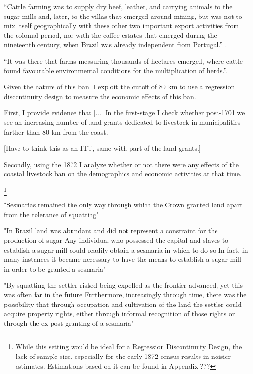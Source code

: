 \documentclass{article}
\begin{document}
\parencite[p~.]{Boxer1962-bj}

``Cattle farming was to supply dry beef, leather, and carrying animals to the sugar mills and, later, to the villas that emerged around mining, but was not to mix itself geographically with these other two important export activities from the colonial period, nor with the coffee estates that emerged during the nineteenth century,  when  Brazil was already independent from  Portugal.'' \parencite{Ribeiro2012-lb}.

``It was there that farms measuring thousands of hectares emerged, where cattle found favourable environmental conditions for the multiplication of herds.''\parencite{Ribeiro2012-lb}.


Given the nature of this ban, I exploit the cutoff of 80 km to use a regression discontinuity design to measure the economic effects of this ban. 

First, I provide evidence that [...] In the first-stage I check whether post-1701 we see an increasing number of land grants dedicated to livestock in municipalities farther than 80 km from the coast. 

[Have to think this as an ITT, same with part of the land grants.]

Secondly, using the 1872 I analyze whether or not there were any effects of the coastal livestock ban on the demographics and economic activities at that time.

\footnote{While this setting would be ideal for a Regression Discontinuity Design, the lack of sample size, especially for the early 1872 census results in noisier estimates. Estimations based on it can be found in Appendix ???}

\textcite{Mueller1995-gi} 

"Sesmarias  remained the only way through  which the  Crown granted  land apart from the tolerance  of squatting" 

"In Brazil land was abundant  and did not represent a constraint  for the production  of sugar   Any individual who 
possessed the capital  and slaves to establish a sugar mill could readily obtain a sesmaria  in which to do so   In fact,  in   many instances  it became necessary to have the means to establish a sugar mill  in order to be granted a sesmaria"

"By squatting the settler risked being expelled as the frontier  advanced, yet this was often  far  in the future   Furthermore,  increasingly   through time, there was the possibility that through occupation and cultivation of the land the settler could acquire  property rights, either through  informal  recognition of those rights or through the ex-post granting of a  sesmaria"
\end{document}
